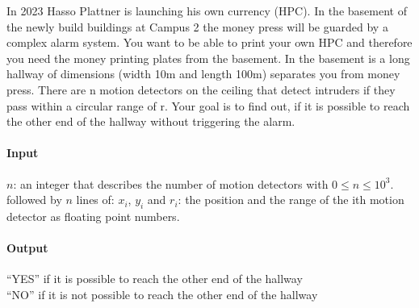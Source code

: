 



\makeheader

In 2023 Hasso Plattner is launching his own currency (HPC). In the basement of the newly build buildings at Campus 2 the money press will be guarded by a complex alarm system. 
You want to be able to print your own HPC and therefore you need the money printing plates from the basement. 
In the basement is a long hallway of dimensions (width 10m and length 100m) separates you from money press. There are n motion detectors on the ceiling that detect intruders if they pass within a circular range of r. 
Your goal is to find out, if it is possible to reach the other end of the hallway without triggering the alarm. 

\paragraph*{Input}
$n$: an integer that describes the number of motion detectors with $0 \leq n \leq 10^3$.\\
followed by $n$ lines of:
$x_i$, $y_i$ and $r_i$: the position and the range of the ith motion detector as floating point numbers. 


\paragraph*{Output}
“YES” if it is possible to reach the other end of the hallway \\
“NO” if it is not possible to reach the other end of the hallway


\begin{samples}
\end{samples}



